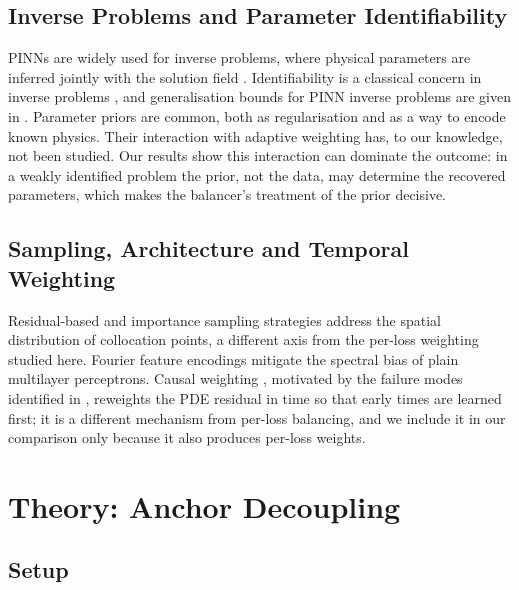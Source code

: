 \documentclass[a4paper,fleqn]{cas-sc}
\begin{document}
\subsection{Inverse Problems and Parameter Identifiability}

PINNs are widely used for inverse problems, where physical parameters are
inferred jointly with the solution field
\citep{raissi2019physics,raissi2020hidden,cai2021physics}. Identifiability is a
classical concern in inverse problems
\citep{tarantola2005inverse,stuart2010inverse}, and generalisation bounds for
PINN inverse problems are given in \citep{mishra2022estimates}. Parameter priors
are common, both as regularisation and as a way to encode known physics. Their
interaction with adaptive weighting has, to our knowledge, not been studied.
Our results show this interaction can dominate the outcome: in a weakly
identified problem the prior, not the data, may determine the recovered
parameters, which makes the balancer's treatment of the prior decisive.

\subsection{Sampling, Architecture and Temporal Weighting}

Residual-based and importance sampling strategies
\citep{lu2021deepxde,nabian2021efficient,wu2023comprehensive} address the
spatial distribution of collocation points, a different axis from the per-loss
weighting studied here. Fourier feature encodings
\citep{rahaman2019spectral,tancik2020fourier,wang2022improved} mitigate the
spectral bias of plain multilayer perceptrons. Causal weighting
\citep{wang2022respecting}, motivated by the failure modes identified in
\citep{krishnapriyan2021characterizing}, reweights the PDE residual in time so
that early times are learned first; it is a different mechanism from per-loss
balancing, and we include it in our comparison only because it also produces
per-loss weights.

\section{Theory: Anchor Decoupling}
\label{sec:theory}

\subsection{Setup}
\end{document}
